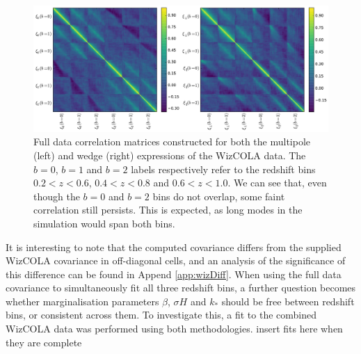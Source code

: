 \documentclass[titlesmallcaps, examinerscopy, copyrightpage]{uqthesis}
\newcommand{\red}{\color{red}}
\begin{document}
\begin{figure}[h!]
  \begin{center}
    \includegraphics[width=\textwidth]{images/fullCorrelations.pdf}
  \end{center}
  \caption{Full data correlation matrices constructed for both the multipole (left) and wedge (right) expressions of the WizCOLA data. The $b=0$, $b=1$ and $b=2$ labels respectively refer to the redshift bins $0.2 < z < 0.6$, $0.4 < z < 0.8$ and $0.6 < z < 1.0$. We can see that, even though the $b=0$ and $b=2$ bins do not overlap, some faint correlation still persists. This is expected, as long modes in the simulation would span both bins.}
  \label{fig:fullCorrelations}
\end{figure}



It is interesting to note that the computed covariance differs from the supplied WizCOLA covariance in off-diagonal cells, and an analysis of the significance of this difference can be found in Append \ref{app:wizDiff}. When using the full data covariance to simultaneously fit all three redshift bins, a further question becomes whether marginalisation parameters $\beta$, $\sigma H$ and $k_*$ should be free between redshift bins, or consistent across them. To investigate this, a fit to the combined WizCOLA data was performed using both methodologies. {\red insert fits here when they are complete}




















\newpage\phantom{blabla}\newpage
\end{document}

